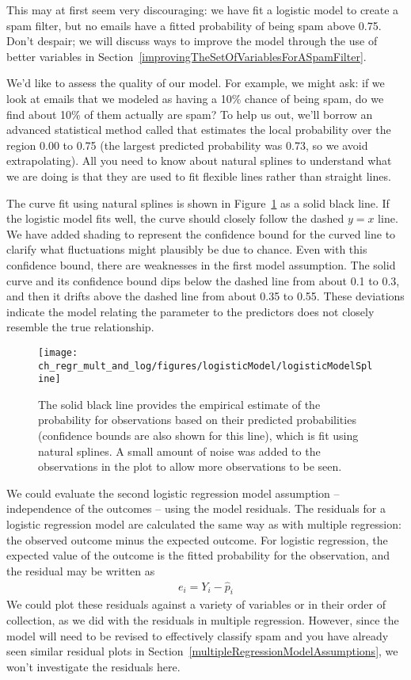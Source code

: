 This may at first seem very discouraging: we have fit a logistic model to create a spam filter, but no emails have a fitted probability of being spam above 0.75. Don't despair; we will discuss ways to improve the model through the use of better variables in Section~\ref{improvingTheSetOfVariablesForASpamFilter}.

We'd like to assess the quality of our model. For example, we might ask: if we look at emails that we modeled as having a 10\% chance of being spam, do we find about 10\% of them actually are spam? To help us out, we'll borrow an advanced statistical method called  that estimates the local probability over the region 0.00 to 0.75 (the largest predicted probability was 0.73, so we avoid extrapolating). All you need to know about natural splines to understand what we are doing is that they are used to fit flexible lines rather than straight lines.

The curve fit using natural splines is shown in Figure~\ref{logisticModelSpline} as a solid black line. If the logistic model fits well, the curve should closely follow the dashed $y=x$ line. We have added shading to represent the confidence bound for the curved line to clarify what fluctuations might plausibly be due to chance. Even with this confidence bound, there are weaknesses in the first model assumption. The solid curve and its confidence bound dips below the dashed line from about 0.1 to 0.3, and then it drifts above the dashed line from about 0.35 to 0.55. These deviations indicate the model relating the parameter to the predictors does not closely resemble the true relationship.

\begin{figure}
\centering
\texttt{[image: ch\_regr\_mult\_and\_log/figures/logisticModel/logisticModelSpline]}
\caption{The solid black line provides the empirical estimate of the probability for observations based on their predicted probabilities (confidence bounds are also shown for this line), which is fit using natural splines. A small amount of noise was added to the observations in the plot to allow more observations to be seen.}
\label{logisticModelSpline}
\end{figure}

We could evaluate the second logistic regression model assumption -- independence of the outcomes -- using the model residuals. The residuals for a logistic regression model are calculated the same way as with multiple regression: the observed outcome minus the expected outcome. For logistic regression, the expected value of the outcome is the fitted probability for the observation, and the residual may be written as
\begin{align*}
e_i = Y_i - \hat{p}_i
\end{align*}
We could plot these residuals against a variety of variables or in their order of collection, as we did with the residuals in multiple regression. However, since the model will need to be revised to effectively classify spam and you have already seen similar residual plots in Section~\ref{multipleRegressionModelAssumptions}, we won't investigate the residuals here.



